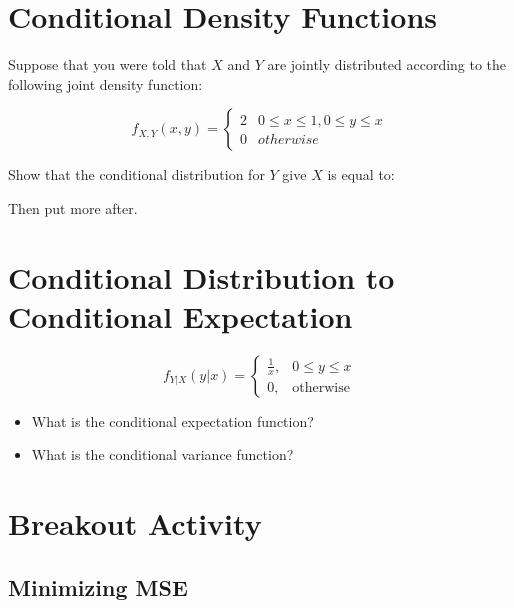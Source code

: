 \documentclass[
]{book}
\theoremstyle{definition}
\theoremstyle{definition}
\theoremstyle{definition}
\theoremstyle{definition}
\theoremstyle{remark}
\begin{document}
\hypertarget{conditional-density-functions}{%
\section{Conditional Density Functions}\label{conditional-density-functions}}

Suppose that you were told that \(X\) and \(Y\) are jointly distributed according to the following joint density function:

\[ 
  f_{X,Y}(x,y) = 
    \begin{cases}
      2 & 0 \leq x \leq 1, 0 \leq y \leq x \\ 
      0 & otherwise
    \end{cases}
\]

Show that the conditional distribution for \(Y\) give \(X\) is equal to:

\vspace{10cm}

Then put more after.

\hypertarget{conditional-distribution-to-conditional-expectation}{%
\section{Conditional Distribution to Conditional Expectation}\label{conditional-distribution-to-conditional-expectation}}

\[
f_{Y|X}(y|x) = 
  \begin{cases}
    \frac{1}{x}, & 0 \leq y \leq x \\ 
    0, & \text{otherwise}
  \end{cases}
\]

\begin{itemize}
\item
  What is the conditional expectation function?
\item
  What is the conditional variance function?
\end{itemize}

\hypertarget{breakout-activity}{%
\section{Breakout Activity}\label{breakout-activity}}

\hypertarget{minimizing-mse}{%
\subsection{Minimizing MSE}\label{minimizing-mse}}
\end{document}
